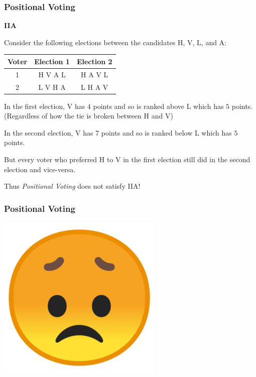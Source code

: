 \documentclass{beamer}
\newcommand{\heading}[1]{{\Large\bfseries #1}\vspace{1em}}
\begin{document}
    \begin{frame}
        \frametitle{Positional Voting}
    
        \heading{IIA}

        Consider the following elections between the candidates H, V, L, and A:
        
        \begin{center}
            \begin{tabular}{|c|c|c|}
                \hline
                Voter & Election 1 & Election 2 \\
                \hline
                1 & H V A L & H A V L \\
                2 & L V H A & L H A V \\
                \hline
            \end{tabular}
        \end{center} \pause

        In the first election, V has $4$ points and so is ranked above L which has $5$ points. (Regardless of how the tie is broken between H and V) \pause

        In the second election, V has $7$ points and so is ranked below L which has $5$ points. \pause

        \alert{But} every voter who preferred H to V in the first election still did in the second election and vice-versa. \pause

        Thus \emph{Positional Voting} \alert{does not satisfy} IIA!
    
    \end{frame}
    \begin{frame}
        \frametitle{Positional Voting}
    
        \begin{center}
            \includegraphics[width=0.5\linewidth]{disappointed_emoji.png}
        \end{center}
    
    \end{frame}
\end{document}
